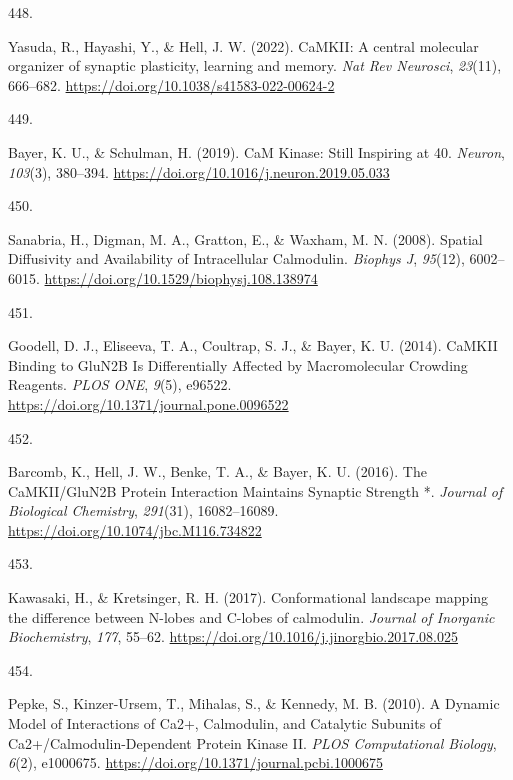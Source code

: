 \documentclass[
  11pt,
  letterpaper,
]{scrreprt}
\newlength{\cslhangindent}
\newlength{\csllabelwidth}
\newenvironment{CSLReferences}[2] %
 {\begin{list}{}{%
  \setlength{\itemindent}{0pt}
  \setlength{\leftmargin}{0pt}
  \setlength{\parsep}{0pt}
  \ifodd #1
   \setlength{\leftmargin}{\cslhangindent}
   \setlength{\itemindent}{-1\cslhangindent}
  \fi
  \setlength{\itemsep}{#2\baselineskip}}}
 {\end{list}}
\newcommand{\CSLLeftMargin}[1]{\parbox[t]{\csllabelwidth}{\strut#1\strut}}
\newcommand{\CSLRightInline}[1]{\parbox[t]{\linewidth - \csllabelwidth}{\strut#1\strut}}
\begin{document}
\begin{CSLReferences}{0}{0}
\CSLLeftMargin{448. }%
\CSLRightInline{Yasuda, R., Hayashi, Y., \& Hell, J. W. (2022).
{CaMKII}: A central molecular organizer of synaptic plasticity, learning
and memory. \emph{Nat Rev Neurosci}, \emph{23}(11), 666--682.
\url{https://doi.org/10.1038/s41583-022-00624-2}}

\CSLLeftMargin{449. }%
\CSLRightInline{Bayer, K. U., \& Schulman, H. (2019). {CaM Kinase}:
{Still Inspiring} at 40. \emph{Neuron}, \emph{103}(3), 380--394.
\url{https://doi.org/10.1016/j.neuron.2019.05.033}}

\CSLLeftMargin{450. }%
\CSLRightInline{Sanabria, H., Digman, M. A., Gratton, E., \& Waxham, M.
N. (2008). Spatial {Diffusivity} and {Availability} of {Intracellular
Calmodulin}. \emph{Biophys J}, \emph{95}(12), 6002--6015.
\url{https://doi.org/10.1529/biophysj.108.138974}}

\CSLLeftMargin{451. }%
\CSLRightInline{Goodell, D. J., Eliseeva, T. A., Coultrap, S. J., \&
Bayer, K. U. (2014). {CaMKII Binding} to {GluN2B Is Differentially
Affected} by {Macromolecular Crowding Reagents}. \emph{PLOS ONE},
\emph{9}(5), e96522. \url{https://doi.org/10.1371/journal.pone.0096522}}

\CSLLeftMargin{452. }%
\CSLRightInline{Barcomb, K., Hell, J. W., Benke, T. A., \& Bayer, K. U.
(2016). The {CaMKII}/{GluN2B Protein Interaction Maintains Synaptic
Strength} *. \emph{Journal of Biological Chemistry}, \emph{291}(31),
16082--16089. \url{https://doi.org/10.1074/jbc.M116.734822}}

\CSLLeftMargin{453. }%
\CSLRightInline{Kawasaki, H., \& Kretsinger, R. H. (2017).
Conformational landscape mapping the difference between {N-lobes} and
{C-lobes} of calmodulin. \emph{Journal of Inorganic Biochemistry},
\emph{177}, 55--62.
\url{https://doi.org/10.1016/j.jinorgbio.2017.08.025}}

\CSLLeftMargin{454. }%
\CSLRightInline{Pepke, S., Kinzer-Ursem, T., Mihalas, S., \& Kennedy, M.
B. (2010). A {Dynamic Model} of {Interactions} of {Ca2}+, {Calmodulin},
and {Catalytic Subunits} of {Ca2}+/{Calmodulin-Dependent Protein Kinase
II}. \emph{PLOS Computational Biology}, \emph{6}(2), e1000675.
\url{https://doi.org/10.1371/journal.pcbi.1000675}}


\end{CSLReferences}
\end{document}
